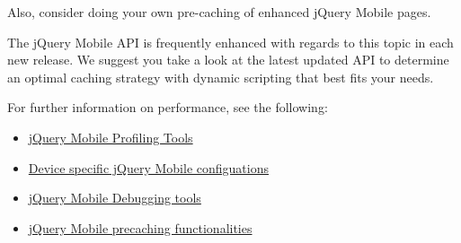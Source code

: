 \documentclass[9pt]{book}
\newenvironment{Shaded}{}{}
\newcommand{\KeywordTok}[1]{\textcolor[rgb]{0.00,0.44,0.13}{\textbf{{#1}}}}
\newcommand{\DataTypeTok}[1]{\textcolor[rgb]{0.56,0.13,0.00}{{#1}}}
\newcommand{\StringTok}[1]{\textcolor[rgb]{0.25,0.44,0.63}{{#1}}}
\newcommand{\OtherTok}[1]{\textcolor[rgb]{0.00,0.44,0.13}{{#1}}}
\newcommand{\FunctionTok}[1]{\textcolor[rgb]{0.02,0.16,0.49}{{#1}}}
\newcommand{\NormalTok}[1]{{#1}}
\begin{document}
\begin{Shaded}
\end{Shaded}

Also, consider doing your own pre-caching of enhanced jQuery Mobile
pages.

The jQuery Mobile API is frequently enhanced with regards to this topic
in each new release. We suggest you take a look at the latest updated
API to determine an optimal caching strategy with dynamic scripting that
best fits your needs.

For further information on performance, see the following:

\begin{itemize}
\itemsep1pt\parskip0pt
\item
  \href{https://github.com/jquery/jquery-mobile/tree/master/tools}{jQuery
  Mobile Profiling Tools}
\item
  \href{http://backbonefu.com/2012/01/jquery-mobile-and-backbone-js-the-ugly/}{Device
  specific jQuery Mobile configuations}
\item
  \href{http://www.objectpartners.com/2012/11/02/use-jquery-mobile\%E2\%80\%99s-tools-suite-to-help-you-debug-and-improve-your-jquery-mobile-application/}{jQuery
  Mobile Debugging tools}
\item
  \href{http://jquerymobile.com/demos/1.2.0/docs/pages/page-cache.html}{jQuery
  Mobile precaching functionalities}
\end{itemize}
\end{document}
